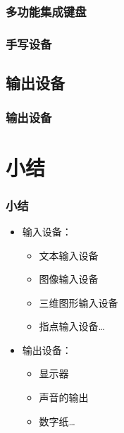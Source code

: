 \documentclass{beamer}
\begin{document}
\begin{frame}
	\frametitle{多功能集成键盘}

\end{frame}

\begin{frame}
	\frametitle{手写设备}

\end{frame}

\subsection{输出设备}
\begin{frame}
	\frametitle{输出设备}

\end{frame}

\section{小结}
\begin{frame}
	\frametitle{小结}
	\begin{itemize}
		\item 输入设备：
		\begin{itemize}
			\item 文本输入设备
			\item 图像输入设备
			\item 三维图形输入设备
			\item 指点输入设备\dots
		\end{itemize}
		\item 输出设备：
		\begin{itemize}
			\item 显示器 
			\item 声音的输出 
			\item 数字纸\dots
		\end{itemize}
	\end{itemize}
\end{frame}
 
\end{document}
